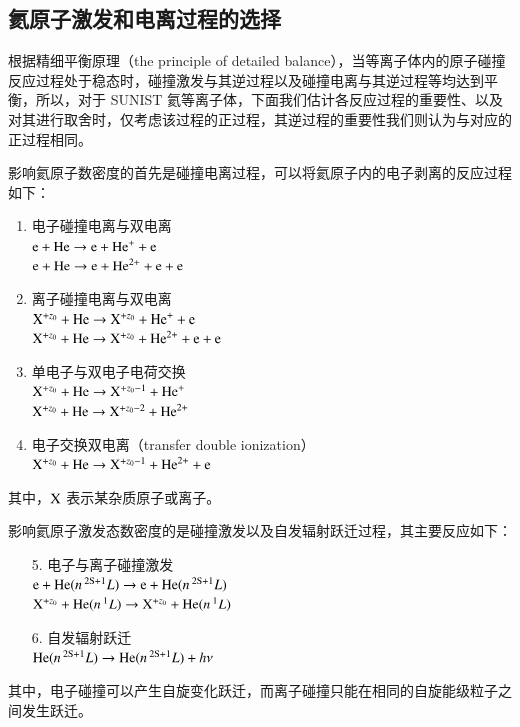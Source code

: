 
\subsection{氦原子激发和电离过程的选择}

根据精细平衡原理（the principle of detailed balance）\cite{Lieberman2005-book}，当等离子体内的原子碰撞反应过程处于稳态时，碰撞激发与其逆过程以及碰撞电离与其逆过程等均达到平衡，所以，对于 SUNIST 氦等离子体，下面我们估计各反应过程的重要性、以及对其进行取舍时，仅考虑该过程的正过程，其逆过程的重要性我们则认为与对应的正过程相同。

影响氦原子数密度的首先是碰撞电离过程，可以将氦原子内的电子剥离的反应过程如下\cite{Anderson1999:Thesis}：
\begin{enumerate}
  \item 电子碰撞电离与双电离\\
        ${\rm e}+{\rm He}\to {\rm e}+{\rm He}^+ + {\rm e}$\\
        ${\rm e}+{\rm He}\to {\rm e}+{\rm He}^{2+} + {\rm e} + {\rm e}$
  \item 离子碰撞电离与双电离\\
        ${\rm X}^{+z_0} + {\rm He} \to {\rm X}^{+z_0} + {\rm He}^+ + {\rm e}$\\
        ${\rm X}^{+z_0} + {\rm He} \to {\rm X}^{+z_0} + {\rm He}^{2+} + {\rm e} + {\rm e}$
  \item 单电子与双电子电荷交换\\
        ${\rm X}^{+z_0} + {\rm He} \to {\rm X}^{+z_0-1} + {\rm He}^+ $\\
        ${\rm X}^{+z_0} + {\rm He} \to {\rm X}^{+z_0-2} + {\rm He}^{2+}$
  \item 电子交换双电离（transfer double ionization）\\
        ${\rm X}^{+z_0} + {\rm He} \to {\rm X}^{+z_0-1} + {\rm He}^{2+} + {\rm e}$
\end{enumerate}
其中，${\rm X}$ 表示某杂质原子或离子。

影响氦原子激发态数密度的是碰撞激发以及自发辐射跃迁过程，其主要反应如下\cite{Anderson1999:Thesis}：
\begin{enumerate}
  \item[5.] 电子与离子碰撞激发\\
        ${\rm e}+{\rm He}(n\,^{\rm 2S+1}{L}) \to {\rm e}+{\rm He}(n\,^{\rm 2S+1}{L})$\\
        ${\rm X}^{+z_0} + {\rm He}(n\,^{1}L) \to {\rm X}^{+z_0} + {\rm He}(n\,^{1}L)$
  \item[6.] 自发辐射跃迁\\
        ${\rm He}(n\,^{\rm 2S+1}L) \to  {\rm He}(n\,^{\rm 2S+1}L) + h\nu$
\end{enumerate}
其中，电子碰撞可以产生自旋变化跃迁，而离子碰撞只能在相同的自旋能级粒子之间发生跃迁。

